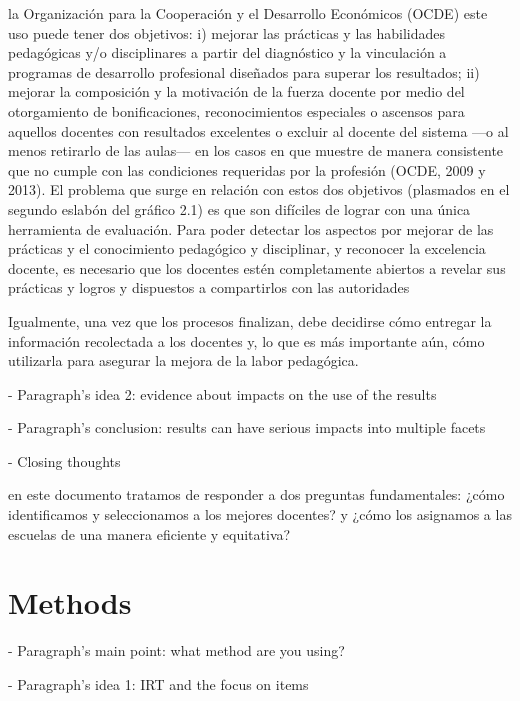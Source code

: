 la Organización para la Cooperación y el Desarrollo Económicos (OCDE) este uso puede tener dos objetivos: i) mejorar las prácticas y las habilidades pedagógicas y/o disciplinares a partir del diagnóstico y la vinculación a programas de desarrollo profesional diseñados para superar los resultados; ii) mejorar la composición y la motivación de la fuerza docente por medio del otorgamiento de bonificaciones, reconocimientos especiales o ascensos para aquellos docentes con resultados excelentes o excluir al docente del sistema —o al menos retirarlo de las aulas— en los casos en que muestre de manera consistente que no cumple con las condiciones requeridas por la profesión (OCDE, 2009 y 2013).
El problema que surge en relación con estos dos objetivos (plasmados en el segundo eslabón del gráfico 2.1) es que son difíciles de lograr con una única herramienta de evaluación.
Para poder detectar los aspectos por mejorar de las prácticas y el conocimiento pedagógico y disciplinar, y reconocer la excelencia docente, es necesario que los docentes estén completamente abiertos a revelar sus prácticas y logros y dispuestos a compartirlos con las autoridades \citep{Hincapie_et_al_2020}

Igualmente, una vez que los procesos finalizan, debe decidirse cómo entregar la información recolectada a los docentes y, lo que es más importante aún, cómo utilizarla para asegurar la mejora de la labor pedagógica. \citep{Hincapie_et_al_2020}



- Paragraph's idea 2: evidence about impacts on the use of the results


- Paragraph's conclusion: results can have serious impacts into multiple facets




- Closing thoughts

en este documento tratamos de responder a dos preguntas fundamentales: ¿cómo identificamos y seleccionamos a los mejores docentes? y ¿cómo los asignamos a las escuelas de una manera eficiente y equitativa? \citep{Bertoni_et_al_2020b}



\section{Methods}

- Paragraph's main point: what method are you using?


- Paragraph's idea 1: IRT and the focus on items

